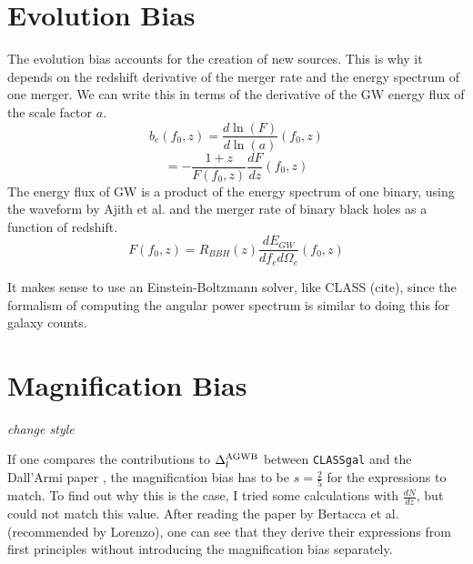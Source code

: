 \section{Evolution Bias}
\label{evo_bias_section}
The evolution bias accounts for the creation of new sources. This is why it depends on the redshift derivative of the merger rate and the energy spectrum of one merger. We can write this in terms of the derivative of the GW energy flux of the scale factor $a$.
\begin{equation}
    b_e(f_0, z) = \frac{d\ln(F)}{d\ln(a)}(f_0, z)
\end{equation}
\begin{equation}
    = -\frac{1+z}{F(f_0, z)}\frac{dF}{dz}(f_0, z)
\end{equation}
The energy flux of GW is a product of the energy spectrum of one binary, using the waveform by Ajith et al. \cite{ajith_inspiral-merger-ringdown_2011} and the merger rate of binary black holes as a function of redshift.
\begin{equation}
    F(f_0, z) = R_{BBH}(z) \frac{d E_{GW}}{df_e d\Omega_e}(f_0, z)
\end{equation}

It makes sense to use an Einstein-Boltzmann solver, like CLASS (cite), since the formalism of computing the angular power spectrum is similar to doing this for galaxy counts.

\section{Magnification Bias}
\textit{change style}


If one compares the contributions to $\Delta_l^{\rm{AGWB}}$ between {\tt CLASSgal} and the Dall'Armi paper \cite{dallarmi_dipole_2022}, the magnification bias has to be
 $s=\frac{2}{5}$ for the expressions to match. To find out why this is the case, 
 I tried some calculations with $\frac{dN}{dz}$, but could not match this value. 
 After reading the paper by Bertacca et al. \cite{bertacca_projection_2020} 
 (recommended by Lorenzo), one can see that they derive their expressions from 
 first principles without introducing the magnification bias separately. 